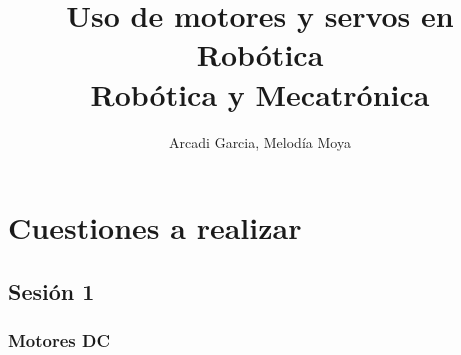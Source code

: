 \documentclass[11pt, a4paper]{article}
\begin{document}
\title{Uso de motores y servos en Robótica \\ {\Large Robótica y Mecatrónica}}
\author{Arcadi Garcia, Melodía Moya} \date{}
\maketitle

\section{Cuestiones a realizar}
	\subsection{Sesión 1}
	\subsubsection{Motores DC}
\end{document}
